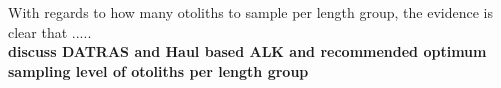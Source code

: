 \documentclass[a4paper 12pt]{article}
\numberwithin{equation}{section}
\begin{document}
{%


With regards to how many otoliths to sample per length group, the evidence is clear that .....\\

{\bf discuss DATRAS and Haul based ALK and recommended optimum sampling level of otoliths per length group}


%

}
\end{document}
